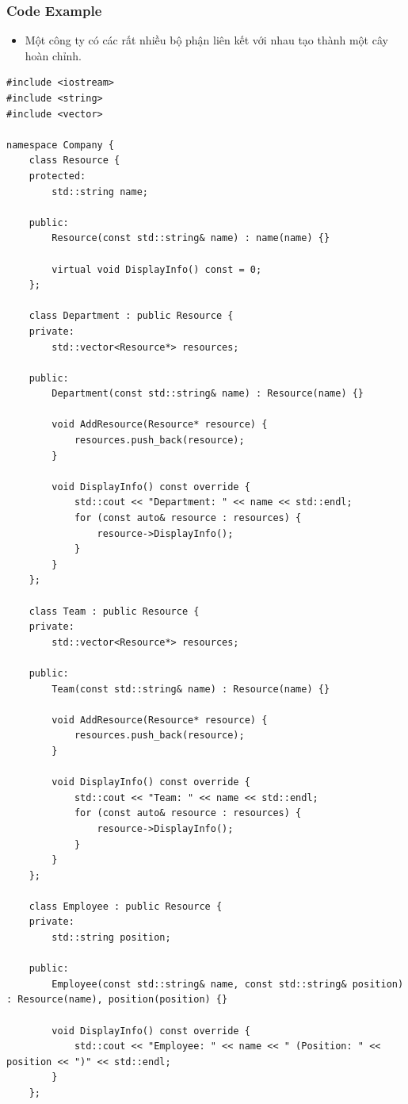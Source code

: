 \subsubsection{Code Example}
\begin{itemize}
    \item Một công ty có các rất nhiều bộ phận liên kết với nhau tạo thành một cây hoàn chỉnh.
\end{itemize}
\begin{lstlisting}
#include <iostream>
#include <string>
#include <vector>

namespace Company {
    class Resource {
    protected:
        std::string name;

    public:
        Resource(const std::string& name) : name(name) {}

        virtual void DisplayInfo() const = 0;
    };

    class Department : public Resource {
    private:
        std::vector<Resource*> resources;

    public:
        Department(const std::string& name) : Resource(name) {}

        void AddResource(Resource* resource) {
            resources.push_back(resource);
        }

        void DisplayInfo() const override {
            std::cout << "Department: " << name << std::endl;
            for (const auto& resource : resources) {
                resource->DisplayInfo();
            }
        }
    };

    class Team : public Resource {
    private:
        std::vector<Resource*> resources;

    public:
        Team(const std::string& name) : Resource(name) {}

        void AddResource(Resource* resource) {
            resources.push_back(resource);
        }

        void DisplayInfo() const override {
            std::cout << "Team: " << name << std::endl;
            for (const auto& resource : resources) {
                resource->DisplayInfo();
            }
        }
    };

    class Employee : public Resource {
    private:
        std::string position;

    public:
        Employee(const std::string& name, const std::string& position) : Resource(name), position(position) {}

        void DisplayInfo() const override {
            std::cout << "Employee: " << name << " (Position: " << position << ")" << std::endl;
        }
    };


\end{lstlisting}
